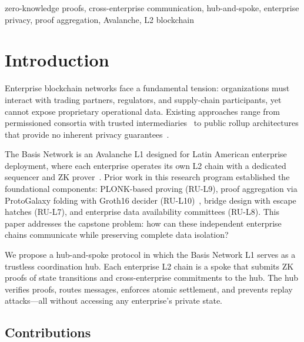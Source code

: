 \documentclass[conference]{IEEEtran}
\begin{document}
\begin{IEEEkeywords}
zero-knowledge proofs, cross-enterprise communication, hub-and-spoke,
enterprise privacy, proof aggregation, Avalanche, L2 blockchain
\end{IEEEkeywords}


\section{Introduction}
\label{sec:introduction}

Enterprise blockchain networks face a fundamental tension: organizations must
interact with trading partners, regulators, and supply-chain participants, yet
cannot expose proprietary operational data. Existing approaches range from
permissioned consortia with trusted intermediaries~\cite{rayls2025} to
public rollup architectures that provide no inherent privacy
guarantees~\cite{agglayer2024, zksync2024}.

The Basis Network is an Avalanche L1 designed for Latin American enterprise
deployment, where each enterprise operates its own L2 chain with a dedicated
sequencer and ZK prover~\cite{ruv7}. Prior work in this research program
established the foundational components: PLONK-based proving (RU-L9), proof
aggregation via ProtoGalaxy folding with Groth16 decider
(RU-L10)~\cite{rul10}, bridge design with escape hatches (RU-L7), and
enterprise data availability committees (RU-L8). This paper addresses the
capstone problem: how can these independent enterprise chains communicate
while preserving complete data isolation?

We propose a hub-and-spoke protocol in which the Basis Network L1 serves as a
trustless coordination hub. Each enterprise L2 chain is a spoke that submits
ZK proofs of state transitions and cross-enterprise commitments to the hub.
The hub verifies proofs, routes messages, enforces atomic settlement, and
prevents replay attacks---all without accessing any enterprise's private
state.

\subsection{Contributions}
\end{document}
